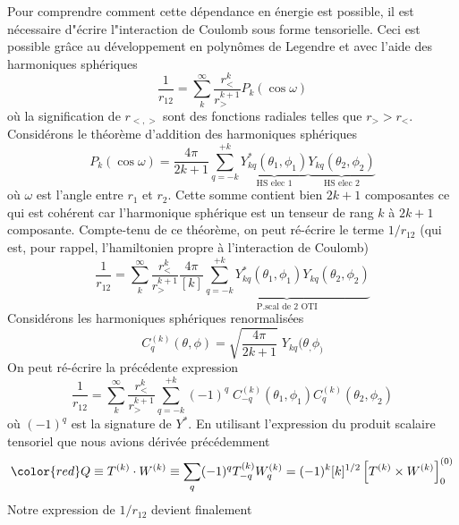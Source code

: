Pour comprendre comment cette dépendance en énergie est possible, il est nécessaire d"écrire l"interaction de Coulomb sous forme tensorielle. Ceci est possible grâce au développement en polynômes de Legendre et avec l'aide des harmoniques sphériques
\begin{equation}
\frac{1}{r_{12}} = \sum_k^\infty \frac{r_<^k}{r_>^{k+1}}
P_k (\cos \omega)
\end{equation}
où la signification de $r_{<,>}$ sont des fonctions radiales telles que $r_> > r_<$. Considérons le
théorème d'addition des harmoniques sphériques 
\begin{equation}
P_k (\cos \omega) = 
\frac{4 \pi}{2k+1} \sum_{q=-k}^{+k} \underbrace{Y^\ast_{kq}(\theta_1, \phi_1)}_{\text{HS elec 1}}
\underbrace{Y_{kq}(\theta_2, \phi_2)}_{\text{HS elec 2}}
\end{equation}
où $\omega$ est l'angle entre $r_1$ et $r_2$. Cette somme contient bien $2k+1$ composantes ce qui est cohérent car l'harmonique sphérique est un tenseur de rang $k$ à $2k+1$ composante. Compte-tenu de ce théorème, on peut ré-écrire le terme $1/r_{12}$ (qui est, pour rappel, l'hamiltonien propre à 
l'interaction de Coulomb)
\begin{equation}
\frac{1}{r_{12}} = \sum_k^\infty \frac{r_<^k}{r_>^{k+1}}
\frac{4 \pi}{[k]} \underbrace{\sum_{q=-k}^{+k} Y^\ast_{kq}(\theta_1, \phi_1)
Y_{kq}(\theta_2, \phi_2)}_{\text{P.scal de 2 OTI}}
\end{equation}
Considérons les harmoniques sphériques renormalisées
\begin{equation}
C^{(k)}_q (\theta, \phi)
=  \sqrt{ \frac{4 \pi}{2k+1} } \;
Y_{kq}(\theta_, \phi_)
\end{equation}
On peut ré-écrire la précédente expression
\begin{equation}
\frac{1}{r_{12}} 
= \sum_k^\infty \frac{r_<^k}{r_>^{k+1}}
 \sum_{q=-k}^{+k} (-1)^q \; C^{(k)}_{-q} (\theta_1, \phi_1)
C^{(k)}_q (\theta_2, \phi_2)
\end{equation}
où $(-1)^q$ est la signature de $Y^*$. En utilisant l'expression du produit scalaire tensoriel que
nous avions dérivée précédemment
\begin{equation}
{\color{red}
Q \equiv T^{(k)} \cdot W^{(k)} } \equiv \sum_q (-1)^q T^{(k)}_{-q}  W^{(k)}_{q}
 =  (-1)^k [k]^{1/2} \left[ T^{(k)} \times W^{(k)} \right] ^{(0)}_0
\end{equation}
Notre expression de $1/r_{12}$ devient finalement\\

\ \\


